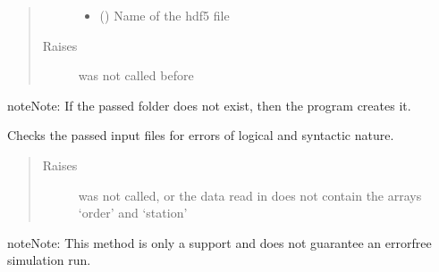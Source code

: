 \documentclass[letterpaper,10pt,english]{sphinxmanual}
\begin{document}
\begin{fulllineitems}
\begin{fulllineitems}
\begin{quote}
\begin{description}
\begin{itemize}
\item {} 
\sphinxAtStartPar
{} () \textendash{} Name of the hdf5 file

\end{itemize}

\item[{Raises}] \leavevmode
\sphinxAtStartPar
{} \textendash{}  was not called before

\end{description}\end{quote}

\begin{sphinxadmonition}{note}{Note:}
\sphinxAtStartPar
If the passed folder does not exist, then the program creates it.
\end{sphinxadmonition}

\end{fulllineitems}


\begin{fulllineitems}
\label{\detokenize{source/API/api:environment.Environment.inspect}}
\sphinxAtStartPar
Checks the passed input files for errors of logical and syntactic nature.
\begin{quote}\begin{description}
\item[{Raises}] \leavevmode
\sphinxAtStartPar
{} \textendash{}  was not called, or the data read in does not contain the arrays
‘order’ and ‘station’

\end{description}\end{quote}

\begin{sphinxadmonition}{note}{Note:}
\sphinxAtStartPar
This method is only a support and does not guarantee an error\sphinxhyphen{}free simulation run.
\end{sphinxadmonition}

\end{fulllineitems}



\end{fulllineitems}
\end{document}
